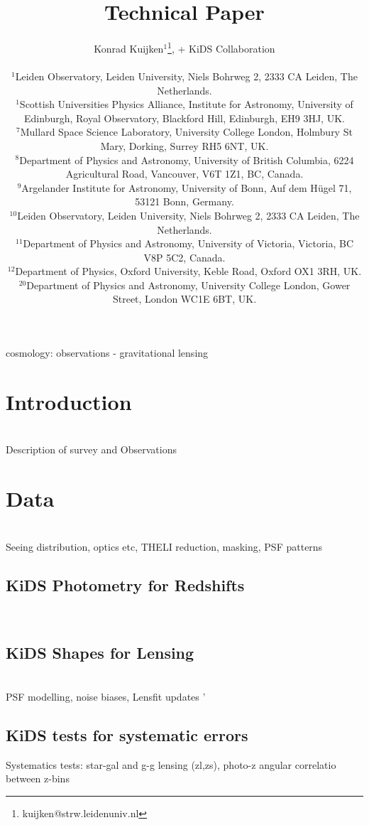 \documentclass[useAMS,usenatbib,times,letter,amssymb]{mn2e}
\title[KiDS]{Technical Paper}
\author[K. Kuijken et al.]{Konrad Kuijken$^{1}$\thanks{kuijken@strw.leidenuniv.nl}, + KiDS Collaboration\\
\\
$^{1}$Leiden Observatory, Leiden University, Niels Bohrweg 2, 2333 CA Leiden, The Netherlands.\\
$^1$Scottish Universities Physics Alliance, Institute for Astronomy, University of Edinburgh, Royal Observatory, Blackford Hill, Edinburgh, EH9 3HJ, UK.\\ 
$^7$Mullard Space Science Laboratory, University College London, Holmbury St Mary, Dorking, Surrey RH5 6NT, UK.\\
$^8$Department of Physics and Astronomy, University of British Columbia, 6224 Agricultural Road, Vancouver, V6T 1Z1, BC, Canada.\\  
$^9$Argelander Institute for Astronomy, University of Bonn, Auf dem H{\"u}gel 71, 53121 Bonn, Germany.\\
$^{10}$Leiden Observatory, Leiden University, Niels Bohrweg 2, 2333 CA Leiden, The Netherlands.\\
$^{11}$Department of Physics and Astronomy, University of Victoria, Victoria, BC V8P 5C2, Canada.\\
$^{12}$Department of Physics, Oxford University, Keble Road, Oxford OX1 3RH, UK.\\ 
$^{20}$Department of Physics and Astronomy, University College London, Gower Street, London WC1E 6BT, UK.\\
}
\newcommand{\red}[1]{{\color{red}{#1}}}
\begin{document}
\maketitle

\begin{abstract}

\end{abstract}


\begin{keywords}
cosmology: observations - gravitational lensing 
\end{keywords}

\section{Introduction}
\label{sec:intro}
\red{KK/JdJ} \\

Description of survey and Observations

\section{Data}
\red{KK/JdJ/TE} \\

Seeing distribution, optics etc, THELI reduction, masking, PSF patterns

\subsection{KiDS Photometry for Redshifts}
\red{KK,HH/AC}\\



\red{Hendrik: photz's}

\subsection{KiDS Shapes for Lensing}
\red{CH/LM/RN}\\

PSF modelling, noise biases, Lensfit updates '\\


\subsection{KiDS tests for systematic errors}
\red{CH/CB/KK/AC}

Systematics tests: star-gal and g-g lensing (zl,zs), photo-z angular correlatio between z-bins
\end{document}
